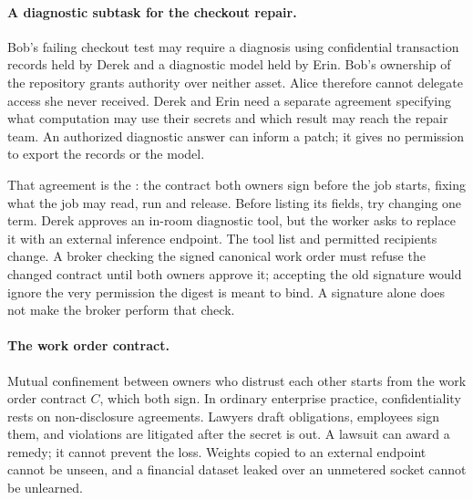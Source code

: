 \documentclass[11pt,a4paper]{article}
\theoremstyle{definition}
\begin{document}
\paragraph{A diagnostic subtask for the checkout repair.}
Bob's failing checkout test may require a diagnosis using confidential
transaction records held by Derek and a diagnostic model held by Erin.
Bob's ownership of the repository grants authority over neither asset.
Alice therefore cannot delegate access she never received. Derek and Erin
need a separate agreement specifying what computation may use their secrets
and which result may reach the repair team. An authorized diagnostic answer
can inform a patch; it gives no permission to export the records or the model.

That agreement is the : the contract both owners sign
before the job starts, fixing what the job may read, run and release. Before
listing its fields, try changing one term. Derek approves an in-room
diagnostic tool, but the worker asks to replace it with an external inference
endpoint. The tool list and permitted recipients change. A broker checking the
signed canonical work order must refuse the changed contract until both owners
approve it; accepting the old signature would ignore the very permission the
digest is meant to bind. A signature alone does not make the broker perform
that check.

\paragraph{The work order contract.}
Mutual confinement between owners who distrust each other starts from the
work order contract $C$, which both sign. In ordinary enterprise practice,
confidentiality rests on non-disclosure agreements. Lawyers draft
obligations, employees sign them, and violations are litigated after the
secret is out. A lawsuit can award a remedy; it cannot prevent the loss.
Weights copied to an external endpoint cannot be unseen, and a financial
dataset leaked over an unmetered socket cannot be unlearned.
\end{document}
